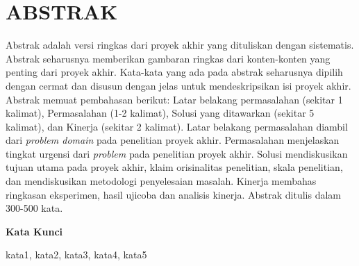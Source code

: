\cleardoublepage
\chapter*{ABSTRAK}
\thispagestyle{fancy}

Abstrak adalah versi ringkas dari proyek akhir yang dituliskan dengan sistematis.
Abstrak seharusnya memberikan gambaran ringkas dari konten-konten yang penting dari
proyek akhir. Kata-kata yang ada pada abstrak seharusnya dipilih dengan cermat dan
disusun dengan jelas untuk mendeskripsikan isi proyek akhir. Abstrak memuat pembahasan
berikut: Latar belakang permasalahan (sekitar 1 kalimat), Permasalahan (1-2 kalimat),
Solusi yang ditawarkan (sekitar 5 kalimat), dan Kinerja (sekitar 2 kalimat). Latar
belakang permasalahan diambil dari \textit{problem domain} pada penelitian proyek akhir.
Permasalahan menjelaskan tingkat urgensi dari \textit{problem} pada penelitian proyek
akhir. Solusi mendiskusikan tujuan utama pada proyek akhir, klaim orisinalitas
penelitian, skala penelitian, dan mendiskusikan metodologi penyelesaian masalah. Kinerja
membahas ringkasan eksperimen, hasil ujicoba dan analisis kinerja. Abstrak ditulis dalam
300-500 kata.

\vspace{0.5cm}
\noindent\textbf{Kata Kunci}

\noindent kata1, kata2, kata3, kata4, kata5